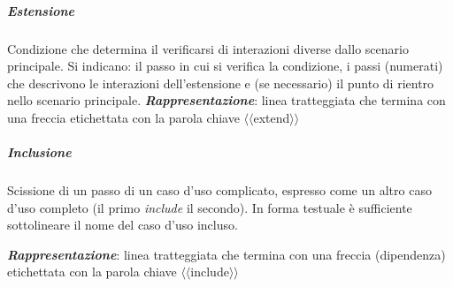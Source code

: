 \subparagraph{Estensione} Condizione che determina il verificarsi di interazioni diverse dallo scenario principale. Si indicano: il passo in cui si verifica la condizione, i passi (numerati) che descrivono le interazioni dell'estensione e (se necessario) il punto di rientro nello scenario principale.
\textbf{\textit{Rappresentazione}}: linea tratteggiata che termina con una freccia etichettata con la parola chiave $\langle\langle$extend$\rangle\rangle$

\begin{figure}[H]
  \centering
  \hfill
\end{figure}

\subparagraph{Inclusione} Scissione di un passo di un caso d'uso complicato, espresso come un altro caso d'uso completo (il primo \textit{include} il secondo). In forma testuale è sufficiente sottolineare il nome del caso d'uso incluso.

\textbf{\textit{Rappresentazione}}: linea tratteggiata che termina con una freccia (dipendenza) etichettata con la parola chiave $\langle\langle$include$\rangle\rangle$

\newpage